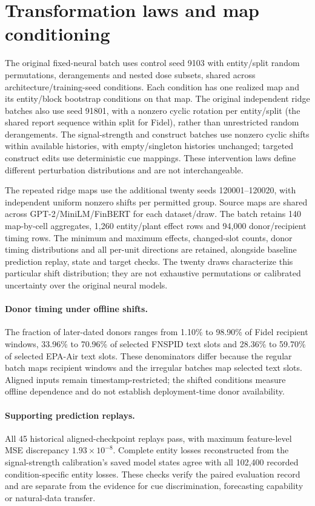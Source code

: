 \section{Transformation laws and map conditioning}
\label{sec:map_conditioning}

The original fixed-neural batch uses control seed 9103 with entity/split random permutations, derangements and nested dose subsets, shared across architecture/training-seed conditions. Each condition has one realized map and its entity/block bootstrap conditions on that map. The original independent ridge batches also use seed 91801, with a nonzero cyclic rotation per entity/split (the shared report sequence within split for Fidel), rather than unrestricted random derangements. The signal-strength and construct batches use nonzero cyclic shifts within available histories, with empty/singleton histories unchanged; targeted construct edits use deterministic cue mappings. These intervention laws define different perturbation distributions and are not interchangeable.

The repeated ridge maps use the additional twenty seeds 120001--120020, with independent uniform nonzero shifts per permitted group. Source maps are shared across GPT-2/MiniLM/FinBERT for each dataset/draw. The batch retains 140 map-by-cell aggregates, 1,260 entity/plant effect rows and 94,000 donor/recipient timing rows. The minimum and maximum effects, changed-slot counts, donor timing distributions and all per-unit directions are retained, alongside baseline prediction replay, state and target checks. The twenty draws characterize this particular shift distribution; they are not exhaustive permutations or calibrated uncertainty over the original neural models.

\paragraph{Donor timing under offline shifts.}
The fraction of later-dated donors ranges from 1.10\% to 98.90\% of Fidel recipient windows, 33.96\% to 70.96\% of selected FNSPID text slots and 28.36\% to 59.70\% of selected EPA-Air text slots. These denominators differ because the regular batch maps recipient windows and the irregular batches map selected text slots. Aligned inputs remain timestamp-restricted; the shifted conditions measure offline dependence and do not establish deployment-time donor availability.

\paragraph{Supporting prediction replays.}
All 45 historical aligned-checkpoint replays pass, with maximum feature-level MSE discrepancy $1.93\times10^{-8}$. Complete entity losses reconstructed from the signal-strength calibration's saved model states agree with all 102,400 recorded condition-specific entity losses. These checks verify the paired evaluation record and are separate from the evidence for cue discrimination, forecasting capability or natural-data transfer.
